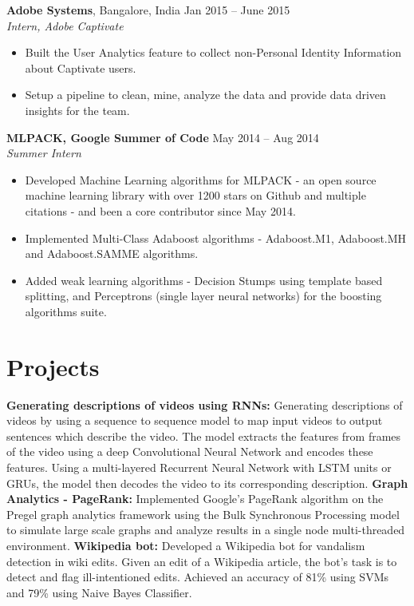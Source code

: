 \documentclass[letterpaper]{article}
\begin{document}
\vspace{-0.5mm}
\textbf{Adobe Systems}, Bangalore, India \hfill Jan 2015 -- June 2015\\
\emph{Intern, Adobe Captivate}\\
\vspace{-6mm}
\begin{itemize}
\item Built the User Analytics feature to collect non-Personal Identity Information about Captivate users. 
\vspace{-2mm}
\item Setup a pipeline to clean, mine, analyze the data and provide data driven insights for the team.
\end{itemize}

\vspace{-0.6mm}

\textbf{MLPACK, Google Summer of Code} \hfill May 2014 -- Aug 2014\\
\emph{Summer Intern}\\
\vspace{-6mm}
\begin{itemize}
\item Developed Machine Learning algorithms for MLPACK - an open source machine learning library with over 1200 stars on Github and multiple citations - and been a core contributor since May 2014.
\vspace{-2mm}
\item Implemented Multi-Class Adaboost algorithms - Adaboost.M1, Adaboost.MH and Adaboost.SAMME algorithms.
\vspace{-2mm}
\item Added weak learning algorithms - Decision Stumps using template based splitting, and Perceptrons (single layer neural networks) for the boosting algorithms suite.
\end{itemize}

\section*{Projects}
\textbf{Generating descriptions of videos using RNNs:}
Generating descriptions of videos by using a sequence to sequence model to map input videos to output sentences which describe the video. The model extracts the features from frames of the video using a deep Convolutional Neural Network and encodes these features. Using a multi-layered Recurrent Neural Network with LSTM units or GRUs, the model then decodes the video to its corresponding description.
\vspace{1mm} \newline
\textbf{Graph Analytics - PageRank:} 
Implemented Google's PageRank algorithm on the Pregel graph analytics framework using the Bulk Synchronous Processing model to simulate large scale graphs and analyze results in a single node multi-threaded environment.
\vspace{1mm} \newline
\textbf{Wikipedia bot:}
Developed a Wikipedia bot for vandalism detection in wiki edits. Given an edit of a Wikipedia article, the bot's task is to detect and flag ill-intentioned edits. Achieved an accuracy of 81\% using SVMs and 79\% using Naive Bayes Classifier.
\end{document}
